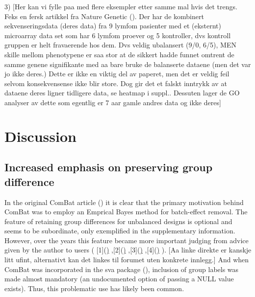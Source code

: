 \documentclass{bio}
\newcommand\NOTE[1]{{\color{red}[#1]}}
\begin{document}



3) \NOTE{Her kan vi fylle paa med flere eksempler etter samme mal hvis det trengs. Feks en fersk artikkel fra Nature Genetic (\citealp{Yoo2014}). Der har de kombinert sekvenseringsdata  (deres data) fra 9 lymfom pasienter med et (eksternt) microarray data set som har 6 lymfom proever og 5 kontroller, dvs kontroll gruppen er helt fravaerende hos dem. Dvs veldig ubalansert (9/0, 6/5), MEN skille mellom phenotypene er saa stor at de sikkert hadde funnet omtrent de samme genene signifikante med aa bare bruke de balanserte dataene (men det var jo ikke deres.) Dette er ikke en viktig del av paperet, men det er veldig feil selvom konsekvensense ikke blir store. Dog gir det et falskt inntrykk av at dataene deres ligner tidligere data, se heatmap i suppl.. Dessuten lager de GO analyser av dette som egentlig er 7 aar gamle andres data og ikke deres}


\section{Discussion}

\subsection{Increased emphasis on preserving group difference}

In the original ComBat article (\citealp{Johnson2007}) it is clear that the primary motivation behind ComBat was to employ an Emprical Bayes method for batch-effect removal. The feature of retaining group differences for unbalanced designs is optional and seems to be subordinate, only exemplified in the supplementary information. However, over the years this feature became more important judging from advice given by the author to users
(
[1](\href{https://groups.google.com/d/msg/combat-user-forum/eSVSKwGtuyE/ZIWV2juYmmAJ})
,[2](\href{https://groups.google.com/d/msg/combat-user-forum/Vkb9p7wekd4/h5Etie7FTVQJ})
,[3](\href{https://groups.google.com/d/msg/combat-user-forum/fpBTcgDjiR8/uo4QIZL4sZgJ})
,[4](\href{https://groups.google.com/d/msg/combat-user-forum/26FZlgU2LFQ/W6U_Lhh_64EJ})
). \NOTE{Aa linke direkte er kanskje litt ufint, alternativt kan det linkes til forumet uten konkrete innlegg.}  
And when ComBat was incorporated in the sva package (\citealp{Leek2012}), inclusion of group labels was made almost mandatory (an undocumented option of passing a NULL value exists). Thus, this problematic use has likely been common.
\end{document}

